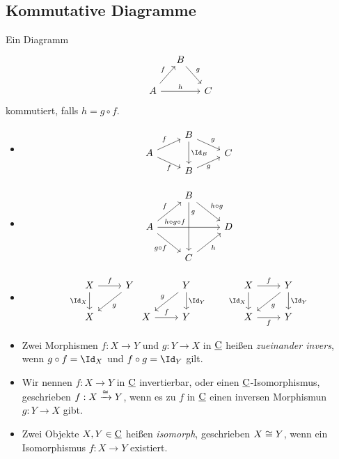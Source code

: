 \subsection{Kommutative Diagramme}

Ein Diagramm
\[
	\begin{tikzcd}[column sep=small]
		& B \arrow{dr}{g} & \\
		A \arrow{ur}{f} \arrow{rr}{h} & & C
	\end{tikzcd}
\]
kommutiert, falls $h = g \circ f$.

\begin{ex}
	\begin{itemize}
		\item
			\[
				\begin{tikzcd}[row sep=tiny]
					& B \arrow{dr}{g} \arrow{dd}{\Id_B} & \\
					A \arrow{ur}{f} \arrow{dr}[below]{f} & & C \\
					& B \arrow{ur}[below]{g} &
				\end{tikzcd}
			\]
		\item
			\[
				\begin{tikzcd}
					~& B \arrow{dd}[yshift=5mm]{g} \arrow{dr}{h\circ g} & \\
					A \arrow{ur}{f} \arrow{rr}[xshift=-5mm]{h\circ g \circ f} \arrow{dr}[swap]{g\circ f} & & D \\
					& C \arrow{ur}[swap]{h} &
				\end{tikzcd}
			\]
		\item
			\[
				\begin{tikzcd}
					X \arrow{d}[swap]{\Id_X} \arrow{r}{f} & Y \arrow{dl}{g} \\
					X &
				\end{tikzcd}
				\begin{tikzcd}
					~& Y \arrow{d}{\Id_Y} \arrow{dl}[swap]{g} \\
					X \arrow{r}{f} & Y
				\end{tikzcd}
				\qquad
				\begin{tikzcd}
					X \arrow{r}{f} \arrow{d}[left]{\Id_X} & Y \arrow{d}{\Id_Y} \arrow{dl}{g} \\
					X \arrow{r}[below]{f} & Y
				\end{tikzcd}
			\]
	\end{itemize}
\end{ex}

\begin{df}
	\begin{itemize}
		\item
			Zwei Morphismen $f: X \to Y$ und $g: Y \to X$ in $\underline{\mathrm{C}}$ heißen \emph{zueinander invers}, wenn $g \circ f = \Id_X$ und $f \circ g = \Id_Y$ gilt.
		\item
			Wir nennen $f: X \to Y$ in $\underline{\mathrm{C}}$ invertierbar, oder einen $\underline{\mathrm{C}}$-Isomorphismus, geschrieben $f: X \xrightarrow{\cong} Y$, wenn es zu $f$ in $\underline{\mathrm{C}}$ einen inversen Morphismun $g: Y \to X$ gibt.
		\item
			Zwei Objekte $X, Y \in \underline{\mathrm{C}}$ heißen \emph{isomorph}, geschrieben $X \cong Y$, wenn ein Isomorphismus $f: X \to Y$ existiert.
	\end{itemize}
\end{df}

